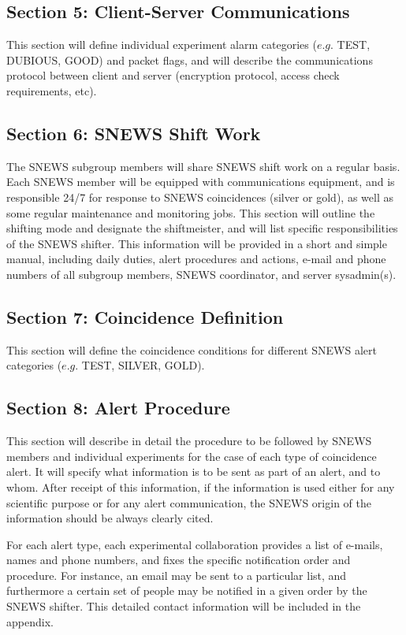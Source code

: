 \documentclass{article}
\begin{document}
\subsection*{Section 5: Client-Server Communications}

This section will define individual experiment alarm categories 
($e.g.$ TEST, DUBIOUS, GOOD) and packet flags, and will describe the 
communications protocol between client and server (encryption
protocol, access check requirements, etc).

\subsection*{Section 6: SNEWS Shift Work}

The SNEWS subgroup members will share SNEWS shift work on a regular
basis.  Each SNEWS member will be equipped with communications
equipment,  and is responsible 24/7 for response to SNEWS coincidences
(silver or gold), as well as some regular maintenance and monitoring
jobs.  This section will outline the shifting mode and designate the
shiftmeister, and will list specific responsibilities of the SNEWS
shifter.  This information will be provided in a short and simple
manual, including daily duties, alert procedures and actions, e-mail
and phone numbers of all subgroup members, SNEWS coordinator, and
server sysadmin(s).

\subsection*{Section 7: Coincidence Definition}

This section will define the coincidence conditions for different
SNEWS alert categories ($e.g.$ TEST, SILVER, GOLD).

\subsection*{Section 8: Alert Procedure}

This section will describe in detail the procedure to be followed by
SNEWS members and individual experiments for the case of each type of
coincidence alert.  It will specify what information is to be sent as
part of an alert, and to whom.  After receipt of this information, if
the information is used either for any scientific purpose or for any
alert communication, the SNEWS origin of the information should be
always clearly cited.

For each alert type, each experimental collaboration 
provides a list of e-mails, names and phone numbers, and fixes
the specific notification order and procedure. For instance, an email may
be sent to a particular list, and furthermore a certain set of
people may be notified in a given order by the SNEWS shifter.
This detailed contact information will be included in the appendix.
\end{document}
